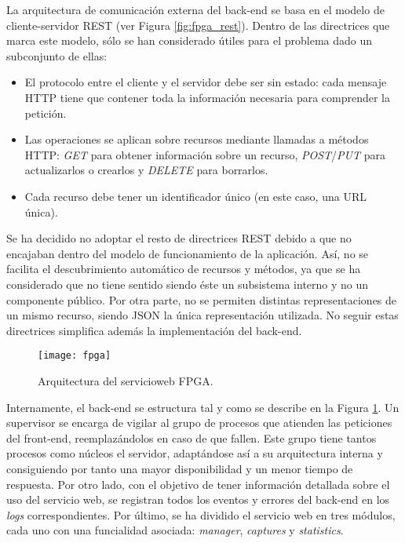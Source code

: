 La arquitectura de comunicación externa del \gls{back-end} se basa en el modelo de cliente-servidor \gls{REST} (ver Figura \ref{fig:fpga_rest}). Dentro de las directrices que marca este modelo, sólo se han considerado útiles para el problema dado un subconjunto de ellas:
\begin{itemize}
  \item El protocolo entre el cliente y el servidor debe ser sin estado: cada mensaje \gls{HTTP} tiene que contener toda la información necesaria para comprender la petición.
  \item Las operaciones se aplican sobre recursos mediante llamadas a métodos \gls{HTTP}: \textit{GET} para obtener información sobre un recurso, \textit{POST}/\textit{PUT} para actualizarlos o crearlos y \textit{DELETE} para borrarlos.
  \item Cada recurso debe tener un identificador único (en este caso, una \gls{URL} única).
\end{itemize}

Se ha decidido no adoptar el resto de directrices \gls{REST} debido a que no encajaban dentro del modelo de funcionamiento de la aplicación.
Así, no se facilita el descubrimiento automático de recursos y métodos, ya que se ha considerado que no tiene sentido siendo éste un subsistema interno y no un componente público.
Por otra parte, no se permiten distintas representaciones de un mismo recurso, siendo \gls{JSON} la única representación utilizada.
No seguir estas directrices simplifica además la implementación del \gls{back-end}.

\begin{figure}[!htp]
  \centering
  \texttt{[image: fpga]}
  \caption{Arquitectura del \gls{servicioweb} \gls{FPGA}.}
  \label{fig:arquitectura_servicio}
\end{figure}

Internamente, el \gls{back-end} se estructura tal y como se describe en la Figura \ref{fig:arquitectura_servicio}.
Un supervisor se encarga de vigilar al grupo de procesos que atienden las peticiones del \gls{front-end}, reemplazándolos en caso de que fallen.
Este grupo tiene tantos procesos como núcleos el servidor, adaptándose así a su arquitectura interna y consiguiendo por tanto una mayor disponibilidad y un menor tiempo de respuesta.
Por otro lado, con el objetivo de tener información detallada sobre el uso del servicio web, se registran todos los eventos y errores del \gls{back-end} en los \textit{logs} correspondientes.
Por último, se ha dividido el servicio web en tres módulos, cada uno con una funcialidad asociada: \textit{manager}, \textit{captures} y \textit{statistics}.

